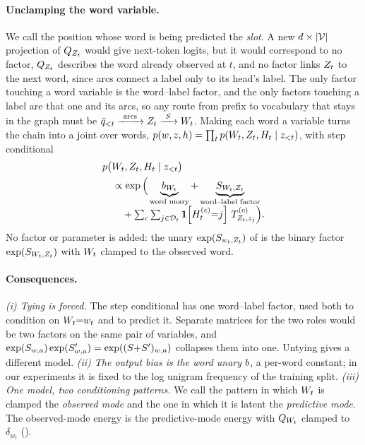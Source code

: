 \paragraph{Unclamping the word variable.}
We call the position whose word is being predicted the \emph{slot}. A new
$d\times|\mathcal{V}|$ projection of $Q_{Z_{t}}$ would give next-token logits, but it would
correspond to no factor, $Q_{Z_{t}}$ describes the word already observed at $t$, and no factor
links $Z_{t}$ to the next word, since arcs connect a label only to its head's label. The only
factor touching a word variable is the word--label factor, and the only factors
touching a label are that one and its arcs, so any route from prefix to vocabulary that stays in
the graph must be
$\bar{q}_{{<}t} \xrightarrow{\ \text{arcs}\ } Z_{t} \xrightarrow{\ S\ } W_{t}$. Making
each word a variable turns the chain into a joint over words,
$p(w,z,h) = \prod_t p(W_{t}, Z_{t}, H_{t} \mid z_{{<}t})$, with step conditional
%
\begin{equation}
\label{eq:unclamp}
\begin{aligned}
 &p\big(W_{t}, Z_{t}, H_{t} \mid z_{{<}t}\big) \\
 &\quad \propto
   \exp\Big(\underbrace{b_{W_{t}}}_{\text{word unary}}
   + \underbrace{S_{W_{t},Z_{t}}}_{\text{word--label factor}} \\[-4pt]
 &\qquad
   + \textstyle\sum_c \sum_{j\in\mathcal{D}_{t}} \mathbf{1}\!\left[H_{t}^{(c)}{=}j\right]\, T^{(c)}_{Z_{t}, z_j}\Big).
\end{aligned}
\end{equation}
%
No factor or parameter is added: the unary $\exp(S_{w_t,Z_{t}})$ of  is
the binary factor $\exp(S_{W_{t},Z_{t}})$ with $W_{t}$ clamped to the observed word.

\paragraph{Consequences.}
\textit{(i) Tying is forced.} The step conditional has one word--label factor, used both to
condition on $W_{t}{=}w_t$ and to predict it. Separate matrices for the two roles would be two
factors on the same pair of variables, and
$\exp(S_{w,a})\exp(S'_{w,a}) = \exp((S{+}S')_{w,a})$ collapses them into one.
Untying gives a different model.
\textit{(ii) The output bias is the word unary} $b$, a per-word constant; in our
experiments it is fixed to the log unigram frequency of the training split.
\textit{(iii) One model, two conditioning patterns.} We call the pattern in which $W_{t}$ is
clamped the \emph{observed mode} and the one in which it is latent the \emph{predictive mode}.
The observed-mode energy is the predictive-mode energy with $Q_{W_{t}}$ clamped to $\delta_{w_t}$
().

